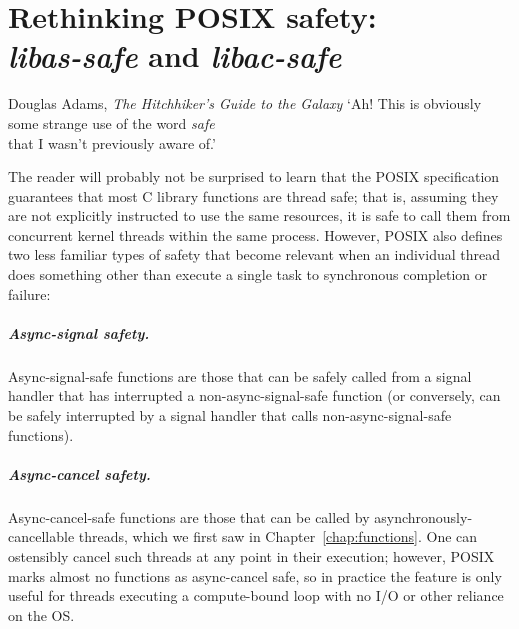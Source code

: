 \chapter{Rethinking POSIX safety: \\ \textit{libas-safe} and \textit{libac-safe}}
\label{chap:safety}

\ifdefined\chapquotes
\vspace{-1in}
\begin{chapquote}[1.75in]{Douglas Adams, \textit{The Hitchhiker's Guide to the Galaxy}}
`Ah!  This is obviously some strange use of the word \textit{safe} \\
that I wasn't previously aware of.'
\end{chapquote}
\fi


The reader will probably not be surprised to learn that the POSIX specification
guarantees that most C library functions are thread safe; that is, assuming they are
not explicitly instructed to use the same resources, it is safe to call them from
concurrent kernel threads within the same process.  However, POSIX also defines two
less familiar types of safety that become relevant when an individual thread does
something other than execute a single task to synchronous completion or failure:

\paragraph{Async-signal safety.}
Async-signal-safe functions are those that can be safely called from a signal handler
that has interrupted a non-async-signal-safe function (or conversely, can be safely
interrupted by a signal handler that calls non-async-signal-safe functions).

\begin{sloppypar}
\paragraph{Async-cancel safety.}
Async-cancel-safe functions are those that can be called by
asynchronously-cancellable threads, which we first saw in
Chapter~\ref{chap:functions}.  One can ostensibly cancel such threads at any point in
their execution; however, POSIX marks almost no functions as async-cancel safe, so in
practice the feature is only useful for threads executing a compute-bound loop with
no I/O or other reliance on the OS.
\\
\end{sloppypar}

